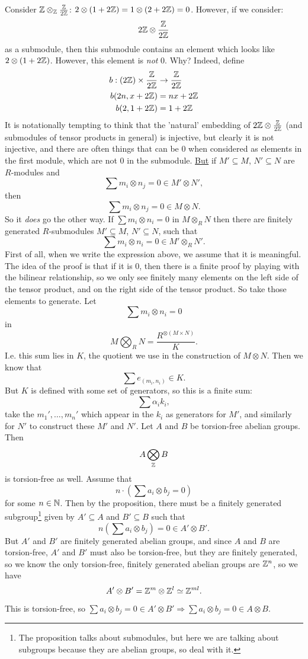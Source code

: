 \documentclass{article}
\begin{document}
    Consider $\mathbb{Z} \otimes_{\mathbb{Z}} \frac{\mathbb{Z}}{2\mathbb{Z}}$: $2 \otimes (1+ 2\mathbb{Z}) = 1 \otimes (2+ 2\mathbb{Z}) = 0$. However, if we consider:
    \[ 2\mathbb{Z} \otimes \frac{\mathbb{Z}}{2\mathbb{Z}}\] as a submodule, then this submodule contains an element which looks like $2 \otimes (1+2\mathbb{Z})$. However, this element is \textit{not} $0$. Why? \gap 
    Indeed, define \begin{align*} b: (2\mathbb{Z}) \times \frac{\mathbb{Z}}{2\mathbb{Z}} &\to \frac{\mathbb{Z}}{2\mathbb{Z}}\\
        b(2n,x+2\mathbb{Z}) &= nx + 2\mathbb{Z}\\
        b(2,1+2\mathbb{Z}) &= 1 + 2\mathbb{Z}\\ 
    \end{align*}
    It is notationally tempting to think that the 'natural' embedding of $2\mathbb{Z} \otimes \frac{\mathbb{Z}}{2\mathbb{Z}}$ (and submodules of tensor products in general) is injective, but clearly it is not injective, and there are often things that can be $0$ when considered as elements in the first module, which are not $0$ in the submodule. \gap \underline{But} if $M' \subseteq M$, $N' \subseteq N$ are $R$-modules and \[\sum m_{i} \otimes n_{j} = 0 \in M' \otimes N',\] then \[\sum m_{i} \otimes n_{j} = 0 \in M \otimes N.\] So it \textit{does} go the other way.
    \prop If $\sum m_{i} \otimes n_{i}=0$ in $M \otimes_{R} N$ then there are finitely generated $R$-submodules $M' \subseteq M$, $N' \subseteq N$, such that \[ \sum m_{i} \otimes n_{i} = 0 \in M' \otimes_{R} N'.\]
    \idea First of all, when we write the expression above, we assume that it is meaningful. The idea of the proof is that if it is $0$, then there is a finite proof by playing with the bilinear relationship, so we only see finitely many elements on the left side of the tensor product, and on the right side of the tensor product. So take those elements to generate.
    \proof Let \[ \sum m_{i} \otimes n_{i} = 0 \] in  \[ M \bigotimes_{R} N = \frac{R^{\otimes(M \times N)}}{K}. \] I.e. this sum lies in $K$, the quotient we use in the construction of $M \otimes N$. Then we know that \[ \sum e_{(m_{i},n_{i})} \in K. \] But $K$ is defined with some set of generators, so this is a finite sum: \[ \sum \alpha_{i}k_{i}, \] take the $m_{1}', \dots, m_{n}'$ which appear in the $k_{i}$ as generators for $M'$, and similarly for $N'$ to construct these $M'$ and $N'$.
    \cor Let $A$ and $B$ be torsion-free abelian groups. Then \[A \bigotimes_{\mathbb{Z}} B\]is torsion-free as well.
    \proof Assume that \[ n \cdot (\sum a_{i} \otimes b_{j} = 0) \] for some $n \in \mathbb{N}$. Then by the proposition, there must be a finitely generated subgroup\footnote{The proposition talks about submodules, but here we are talking about subgroups because they are abelian groups, so deal with it.} given by $A' \subseteq A$ and $B' \subseteq B$ such that \[ n( \sum a_{i} \otimes b_{j}) = 0 \in A' \otimes B'.\] But $A'$ and $B'$ are finitely generated abelian groups, and since $A$ and $B$ are torsion-free, $A'$ and $B'$ must also be torsion-free, but they are finitely generated, so we know the only torsion-free, finitely generated abelian groups are $\mathbb{Z}^{n}$, so we have \[ A' \otimes B' = \mathbb{Z}^{m} \otimes \mathbb{Z}^{l} \simeq \mathbb{Z}^{ml}. \] This is torsion-free, so $\sum a_{i} \otimes b_{j} = 0 \in A' \otimes B' \Rightarrow \sum a_{i} \otimes b_{j} = 0 \in A \otimes B.$ \endproof 
\end{document}
